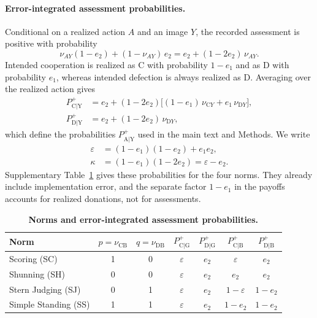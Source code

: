 \documentclass[10pt]{wlscirep}
\newcommand{\Pp}[1]{P^{+}_{\mathrm{#1}}}   %
\theoremstyle{plain}
\theoremstyle{remark}
\begin{document}
\paragraph{Error-integrated assessment probabilities.} Conditional on a realized action $A$ and an image $Y$, the recorded assessment is positive with probability
\begin{equation}
\nu_{AY}(1-e_2)+(1-\nu_{AY})\,e_2=e_2+(1-2e_2)\,\nu_{AY}.
\label{eq:s-recorded}
\end{equation}
Intended cooperation is realized as C with probability $1-e_1$ and as D with probability $e_1$, whereas intended defection is always realized as D. Averaging over the realized action gives
\begin{equation}
\begin{aligned}
\Pp{C|Y}&=e_2+(1-2e_2)\bigl[(1-e_1)\,\nu_{\mathrm CY}+e_1\,\nu_{\mathrm DY}\bigr],\\
\Pp{D|Y}&=e_2+(1-2e_2)\,\nu_{\mathrm DY},
\end{aligned}
\label{eq:s-assessment-general}
\end{equation}
which define the probabilities $\Pp{A|Y}$ used in the main text and Methods. We write
\begin{equation}
\begin{aligned}
\varepsilon&=(1-e_1)(1-e_2)+e_1e_2,\\
\kappa&=(1-e_1)(1-2e_2)=\varepsilon-e_2.
\end{aligned}
\label{eq:s-eps-kappa}
\end{equation}
Supplementary Table~\ref{tab:si-norms} gives these probabilities for the four norms. They already include implementation error, and the separate factor $1-e_1$ in the payoffs accounts for realized donations, not for assessments.

\begin{table}[!htbp]
\centering
\caption{\textbf{Norms and error-integrated assessment probabilities.}}
\label{tab:si-norms}
\small
\begin{tabular}{@{}lcccccc@{}}
\toprule
Norm & $p=\nu_{\mathrm{CB}}$ & $q=\nu_{\mathrm{DB}}$ & $\Pp{C|G}$ & $\Pp{D|G}$ & $\Pp{C|B}$ & $\Pp{D|B}$\\
\midrule
Scoring (SC) & 1 & 0 & $\varepsilon$ & $e_2$ & $\varepsilon$ & $e_2$\\
Shunning (SH) & 0 & 0 & $\varepsilon$ & $e_2$ & $e_2$ & $e_2$\\
Stern Judging (SJ) & 0 & 1 & $\varepsilon$ & $e_2$ & $1-\varepsilon$ & $1-e_2$\\
Simple Standing (SS) & 1 & 1 & $\varepsilon$ & $e_2$ & $1-e_2$ & $1-e_2$\\
\bottomrule
\end{tabular}
\end{table}
\end{document}
